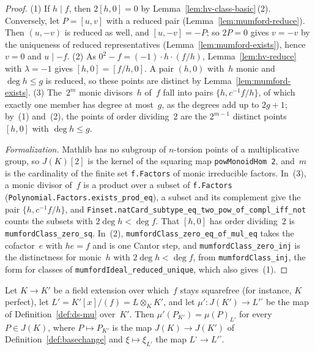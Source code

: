 \begin{proof}
\leanok
{}
(1) If $h \mid f$, then $2[h, 0] = 0$ by Lemma~\ref{lem:hv-class-basic}\,(2). Conversely, let
$P = [u, v]$ with a reduced pair (Lemma~\ref{lem:mumford-reduce}). Then $(u, -v)$ is reduced as
well, and $[u, -v] = -P$; so $2P = 0$ gives $v = -v$ by the uniqueness of reduced representatives
(Lemma~\ref{lem:mumford-exists}), hence $v = 0$ and $u \mid -f$. (2) As
$0^2 - f = (-1) \cdot h \cdot (f/h)$, Lemma~\ref{lem:hv-reduce} with $\lambda = -1$ gives
$[h, 0] = [f/h, 0]$. A pair $(h, 0)$ with~$h$ monic and $\deg h \le g$ is reduced, so these points
are distinct by Lemma~\ref{lem:mumford-exists}. (3) The~$2^m$ monic divisors~$h$ of~$f$ fall into
pairs $\{h, c^{-1}f/h\}$, of which exactly one member has degree at most~$g$, as the degrees add
up to $2g + 1$; by~(1) and~(2), the points of order dividing~$2$ are the $2^{m-1}$ distinct points
$[h, 0]$ with $\deg h \le g$.

\emph{Formalization.} Mathlib has no subgroup of $n$-torsion points of a multiplicative group, so
$J(K)[2]$ is the kernel of the squaring map \texttt{powMonoidHom 2}, and~$m$ is the cardinality of
the finite set \texttt{f.Factors} of monic irreducible factors. In~(3), a monic divisor of~$f$ is a
product over a subset of \texttt{f.Factors} (\texttt{Polynomial.Factors.exists\_prod\_eq}), a subset
and its complement give the pair $\{h, c^{-1}f/h\}$, and
\texttt{Finset.natCard\_subtype\_eq\_two\_pow\_of\_compl\_iff\_not} counts the subsets with
$2\deg h < \deg f$. That $[h, 0]$ has order dividing~$2$ is \texttt{mumfordClass\_zero\_sq}.
In~(2), \texttt{mumfordClass\_zero\_eq\_of\_mul\_eq} takes the cofactor~$e$ with $he = f$ and is
one Cantor step, and \texttt{mumfordClass\_zero\_inj} is the distinctness for monic~$h$ with
$2\deg h < \deg f$, from \texttt{mumfordClass\_inj}, the form for classes of
\texttt{mumfordIdeal\_reduced\_unique}, which also gives~(1).
\end{proof}

\begin{theorem}
\label{thm:ds-naturality}
\leanok
{}
Let $K \to K'$ be a field extension over which~$f$ stays squarefree (for instance, $K$ perfect),
let $L' = K'[x]/(f) = L \otimes_K K'$, and let $\mu' \colon J(K') \to L'^\square$ be the map of
Definition~\ref{def:ds-mu} over~$K'$. Then $\mu'(P_{K'}) = \mu(P)_{L'}$ for every $P \in J(K)$,
where $P \mapsto P_{K'}$ is the map $J(K) \to J(K')$ of Definition~\ref{def:basechange} and
$\xi \mapsto \xi_{L'}$ the map $L^\square \to L'^\square$.
\end{theorem}

